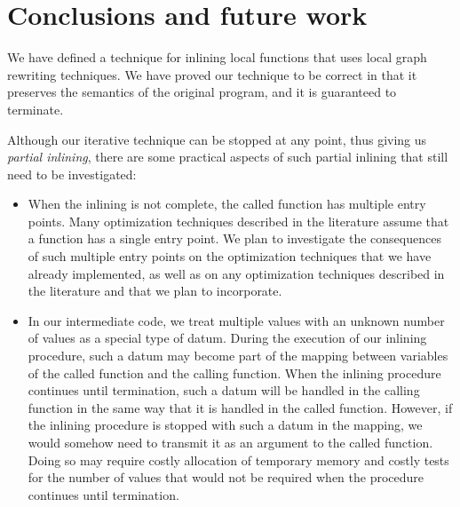 \section{Conclusions and future work}
\label{sec-conclusions}

We have defined a technique for inlining local functions that uses
local graph rewriting techniques.  We have proved our technique to be
correct in that it preserves the semantics of the original program,
and it is guaranteed to terminate.

Although our iterative technique can be stopped at any point, thus
giving us \emph{partial inlining}, there are some practical aspects of
such partial inlining that still need to be investigated:

\begin{itemize}
\item When the inlining is not complete, the called function has
  multiple entry points.  Many optimization techniques described in
  the literature assume that a function has a single entry point.  We
  plan to investigate the consequences of such multiple entry points
  on the optimization techniques that we have already implemented, as
  well as on any optimization techniques described in the literature
  and that we plan to incorporate.
\item In our intermediate code, we treat multiple values with an
  unknown number of values as a special type of datum.  During the
  execution of our inlining procedure, such a datum may become part of
  the mapping between variables of the called function and the calling
  function.  When the inlining procedure continues until termination,
  such a datum will be handled in the calling function in the same way
  that it is handled in the called function.  However, if the inlining
  procedure is stopped with such a datum in the mapping, we would
  somehow need to transmit it as an argument to the called function.
  Doing so may require costly allocation of temporary memory and
  costly tests for the number of values that would not be required
  when the procedure continues until termination.
\end{itemize}
